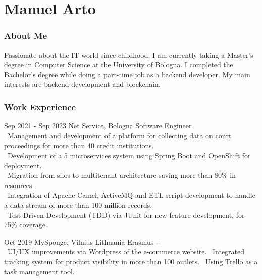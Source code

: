 \documentclass{tccv}
\begin{document}
\part{Manuel Arto}

\section{About Me}

Passionate about the IT world since childhood, I am currently taking a Master's degree in Computer Science at the University of Bologna. I completed the Bachelor's degree while doing a part-time job as a backend developer. My main interests are backend development and blockchain.


\section{Work Experience}

\begin{eventlist}

     \item{Sep 2021 - Sep 2023}
     {Net Service, Bologna}
     {Software Engineer} \\
     \textbullet~Management and development of a platform for collecting data on court proceedings for more than 40 credit institutions. \\
     \textbullet~Development of a 5 microservices system using Spring Boot and OpenShift for deployment. \\
     \textbullet~Migration from silos to multitenant architecture saving more than 80\% in resources. \\
     \textbullet~Integration of Apache Camel, ActiveMQ and ETL script development to handle a data stream of more than 100 million records. \\
     \textbullet~Test-Driven Development (TDD) via JUnit for new feature development, for 75\% coverage.

\item{Oct 2019}
     {MySponge, Vilnius Lithuania}
     {Erasmus +} \\
     \textbullet~UI/UX improvements via Wordpress of the e-commerce website. \newline
     \textbullet~Integrated tracking system for product visibility in more than 100 outlets. \newline
     \textbullet~Using Trello as a task management tool.

\end{eventlist}
\end{document}

